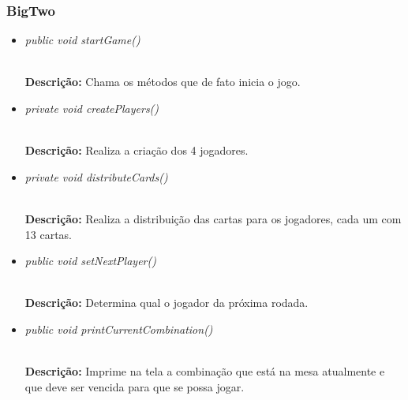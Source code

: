 \documentclass[12pt]{article}
\begin{document}
\vspace{0.2 true cm}

\subsubsection{BigTwo}

\begin{itemize}
\item \begin{large}\textit{public void startGame()}\end{large}\\
\subitem \textbf{Descrição:} Chama os métodos que de fato inicia o jogo.
\end{itemize}

\vspace{0.2 true cm}

\begin{itemize}
\item \begin{large}\textit{private void createPlayers()}\end{large}\\
\subitem \textbf{Descrição:} Realiza a criação dos 4 jogadores.
\end{itemize}

\vspace{0.2 true cm}

\begin{itemize}
\item \begin{large}\textit{private void distributeCards()}\end{large}\\
\subitem \textbf{Descrição:} Realiza a distribuição das cartas para os jogadores, cada um com 13 cartas.
\end{itemize}

\vspace{0.2 true cm}

\begin{itemize}
\item \begin{large}\textit{public void setNextPlayer()}\end{large}\\
\subitem \textbf{Descrição:} Determina qual o jogador da próxima rodada.
\end{itemize}

\vspace{0.2 true cm}

\begin{itemize}
\item \begin{large}\textit{public void printCurrentCombination()}\end{large}\\
\subitem \textbf{Descrição:} Imprime na tela a combinação que está na mesa atualmente e que deve ser vencida para que se possa jogar.
\end{itemize}
\end{document}

